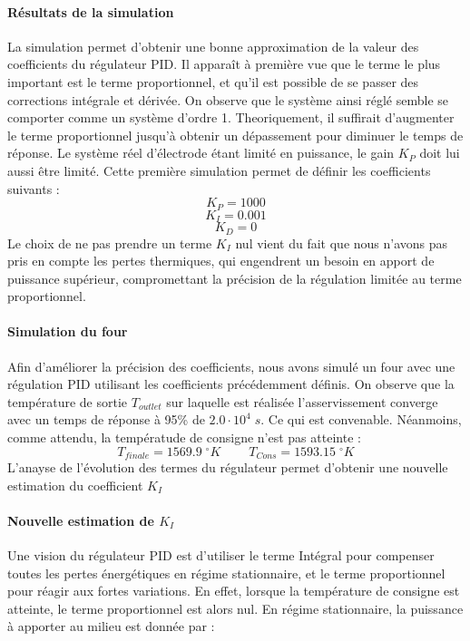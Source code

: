 \documentclass[12pt, a4paper, french, BCOR = 0pt, DIV = 10]{scrartcl}
\begin{document}
    \paragraph{Résultats de la simulation}
    La simulation permet d'obtenir une bonne approximation de la valeur des coefficients du régulateur PID. Il apparaît à première vue que le terme le plus important est le terme proportionnel, et qu'il est possible de se passer des corrections intégrale et dérivée. On observe que le système ainsi réglé semble se comporter comme un système d'ordre 1. Theoriquement, il suffirait d'augmenter le terme proportionnel jusqu'à obtenir un dépassement pour diminuer le temps de réponse. Le système réel d'électrode étant limité en puissance, le gain $K_P$ doit lui aussi être limité.     
    Cette première simulation permet de définir les coefficients suivants :
    $$K_P=1000$$
    $$K_I=0.001$$
    $$K_D=0$$
    Le choix de ne pas prendre un terme $K_I$ nul vient du fait que nous n'avons pas pris en compte les pertes thermiques, qui engendrent un besoin en apport de puissance supérieur, compromettant la précision de la régulation limitée au terme proportionnel.

    \paragraph{Simulation du four}
    Afin d'améliorer la précision des coefficients, nous avons simulé un four avec une régulation PID utilisant les coefficients précédemment définis. On observe que la température de sortie $T_{outlet}$ sur laquelle est réalisée l'asservissement converge avec un temps de réponse à 95\% de $2.0\cdot10^4 \; s$. Ce qui est convenable. Néanmoins, comme attendu, la températude de consigne n'est pas atteinte :
    $$T_{finale}=1569.9 \;^{\circ}K ~~~~~~~~~~ T_{Cons}=1593.15 \;^{\circ}K$$
    L'anayse de l'évolution des termes du régulateur permet d'obtenir une nouvelle estimation du coefficient $K_I$

    \paragraph{Nouvelle estimation de $K_I$}
    Une vision du régulateur PID est d'utiliser le terme Intégral pour compenser toutes les pertes énergétiques en régime stationnaire, et le terme proportionnel pour réagir aux fortes variations. En effet, lorsque la température de consigne est atteinte, le terme proportionnel est alors nul. En régime stationnaire, la puissance à apporter au milieu est donnée par : 
    
\end{document}
